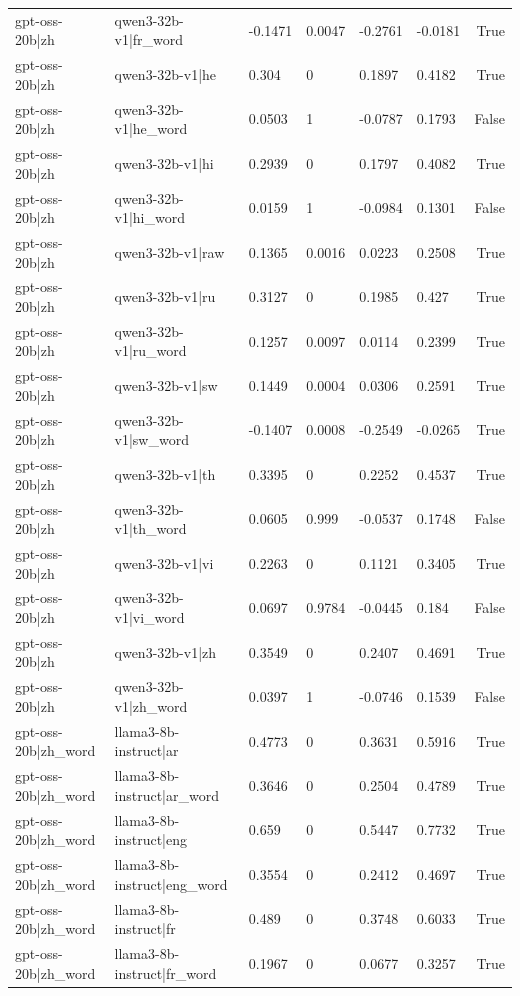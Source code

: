 \begin{table}
\begin{tabular}{llllllr}
gpt-oss-20b|zh & qwen3-32b-v1|fr_word & -0.1471 & 0.0047 & -0.2761 & -0.0181 & True \\
gpt-oss-20b|zh & qwen3-32b-v1|he & 0.304 & 0 & 0.1897 & 0.4182 & True \\
gpt-oss-20b|zh & qwen3-32b-v1|he_word & 0.0503 & 1 & -0.0787 & 0.1793 & False \\
gpt-oss-20b|zh & qwen3-32b-v1|hi & 0.2939 & 0 & 0.1797 & 0.4082 & True \\
gpt-oss-20b|zh & qwen3-32b-v1|hi_word & 0.0159 & 1 & -0.0984 & 0.1301 & False \\
gpt-oss-20b|zh & qwen3-32b-v1|raw & 0.1365 & 0.0016 & 0.0223 & 0.2508 & True \\
gpt-oss-20b|zh & qwen3-32b-v1|ru & 0.3127 & 0 & 0.1985 & 0.427 & True \\
gpt-oss-20b|zh & qwen3-32b-v1|ru_word & 0.1257 & 0.0097 & 0.0114 & 0.2399 & True \\
gpt-oss-20b|zh & qwen3-32b-v1|sw & 0.1449 & 0.0004 & 0.0306 & 0.2591 & True \\
gpt-oss-20b|zh & qwen3-32b-v1|sw_word & -0.1407 & 0.0008 & -0.2549 & -0.0265 & True \\
gpt-oss-20b|zh & qwen3-32b-v1|th & 0.3395 & 0 & 0.2252 & 0.4537 & True \\
gpt-oss-20b|zh & qwen3-32b-v1|th_word & 0.0605 & 0.999 & -0.0537 & 0.1748 & False \\
gpt-oss-20b|zh & qwen3-32b-v1|vi & 0.2263 & 0 & 0.1121 & 0.3405 & True \\
gpt-oss-20b|zh & qwen3-32b-v1|vi_word & 0.0697 & 0.9784 & -0.0445 & 0.184 & False \\
gpt-oss-20b|zh & qwen3-32b-v1|zh & 0.3549 & 0 & 0.2407 & 0.4691 & True \\
gpt-oss-20b|zh & qwen3-32b-v1|zh_word & 0.0397 & 1 & -0.0746 & 0.1539 & False \\
gpt-oss-20b|zh_word & llama3-8b-instruct|ar & 0.4773 & 0 & 0.3631 & 0.5916 & True \\
gpt-oss-20b|zh_word & llama3-8b-instruct|ar_word & 0.3646 & 0 & 0.2504 & 0.4789 & True \\
gpt-oss-20b|zh_word & llama3-8b-instruct|eng & 0.659 & 0 & 0.5447 & 0.7732 & True \\
gpt-oss-20b|zh_word & llama3-8b-instruct|eng_word & 0.3554 & 0 & 0.2412 & 0.4697 & True \\
gpt-oss-20b|zh_word & llama3-8b-instruct|fr & 0.489 & 0 & 0.3748 & 0.6033 & True \\
gpt-oss-20b|zh_word & llama3-8b-instruct|fr_word & 0.1967 & 0 & 0.0677 & 0.3257 & True \\

\end{tabular}
\end{table}
